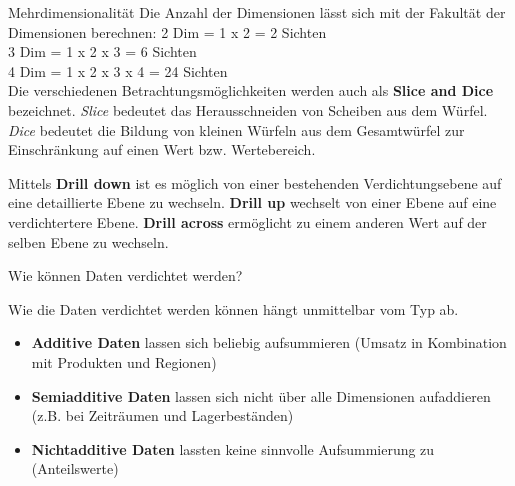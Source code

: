 \documentclass[a6paper,10pt,grid=front%
,toc
]{kartei}
\begin{document}
  \begin{karte}{Mehrdimensionalität}  
    Die Anzahl der Dimensionen lässt sich mit der Fakultät der Dimensionen berechnen:
    2 Dim = 1 x 2 = 2 Sichten\\
    3 Dim = 1 x 2 x 3 = 6 Sichten\\
    4 Dim = 1 x 2 x 3 x 4 = 24 Sichten\\

    Die verschiedenen Betrachtungsmöglichkeiten werden auch als \textbf{Slice and Dice} bezeichnet. \textit{Slice} bedeutet das Herausschneiden von Scheiben aus dem Würfel. \textit{Dice} bedeutet die Bildung von kleinen Würfeln aus dem Gesamtwürfel zur Einschränkung auf einen Wert bzw. Wertebereich.

    Mittels \textbf{Drill down} ist es möglich von einer bestehenden Verdichtungsebene auf eine detaillierte Ebene zu wechseln. \textbf{Drill up} wechselt von einer Ebene auf eine verdichtertere Ebene. \textbf{Drill across} ermöglicht zu einem anderen Wert auf der selben Ebene zu wechseln.
  \end{karte}

  \begin{karte}{Wie können Daten verdichtet werden?}  
    
    Wie die Daten verdichtet werden können hängt unmittelbar vom Typ ab.

    \begin{itemize}
      \item \textbf{Additive Daten} lassen sich beliebig aufsummieren (Umsatz in Kombination mit Produkten und Regionen)
      \item \textbf{Semiadditive Daten} lassen sich nicht über alle Dimensionen aufaddieren (z.B. bei Zeiträumen und Lagerbeständen)
      \item \textbf{Nichtadditive Daten} lassten keine sinnvolle Aufsummierung zu (Anteilswerte)
    \end{itemize}
  \end{karte}
\end{document}
